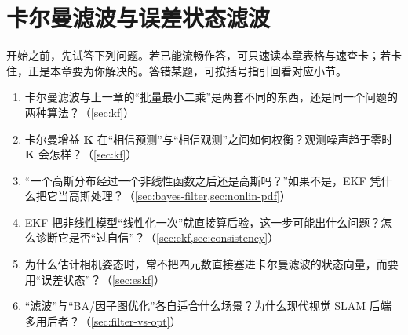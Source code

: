 \chapter{卡尔曼滤波与误差状态滤波}
\label{ch:eskf}


\begin{practice}[前置自测]
开始之前，先试答下列问题。若已能流畅作答，可只速读本章表格与速查卡；若卡住，正是本章要为你解决的。\;答错某题，可按括号指引回看对应小节。
\begin{enumerate}
  \item 卡尔曼滤波与上一章的“批量最小二乘”是两套不同的东西，还是同一个问题的两种算法？（\cref{sec:kf}）
  \item 卡尔曼增益 $\mathbf{K}$ 在“相信预测”与“相信观测”之间如何权衡？观测噪声趋于零时 $\mathbf{K}$ 会怎样？（\cref{sec:kf}）
  \item “一个高斯分布经过一个非线性函数之后还是高斯吗？”如果不是，EKF 凭什么把它当高斯处理？（\cref{sec:bayes-filter,sec:nonlin-pdf}）
  \item EKF 把非线性模型“线性化一次”就直接算后验，这一步可能出什么问题？怎么诊断它是否“过自信”？（\cref{sec:ekf,sec:consistency}）
  \item 为什么估计相机姿态时，常不把四元数直接塞进卡尔曼滤波的状态向量，而要用“误差状态”？（\cref{sec:eskf}）
  \item “滤波”与“BA/因子图优化”各自适合什么场景？为什么现代视觉 SLAM 后端多用后者？（\cref{sec:filter-vs-opt}）
\end{enumerate}
\end{practice}

